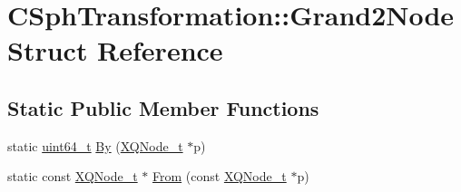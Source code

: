 \hypertarget{structCSphTransformation_1_1Grand2Node}{\section{C\-Sph\-Transformation\-:\-:Grand2\-Node Struct Reference}
\label{structCSphTransformation_1_1Grand2Node}
}
\subsection*{Static Public Member Functions}
\begin{DoxyCompactItemize}
\item 
static \hyperlink{sphinxstd_8h_aaa5d1cd013383c889537491c3cfd9aad}{uint64\-\_\-t} \hyperlink{structCSphTransformation_1_1Grand2Node_a3b54d7583d2c062c8709a0dbc57c2d38}{By} (\hyperlink{structXQNode__t}{X\-Q\-Node\-\_\-t} $\ast$p)
\item 
static const \hyperlink{structXQNode__t}{X\-Q\-Node\-\_\-t} $\ast$ \hyperlink{structCSphTransformation_1_1Grand2Node_a7cb75bca3049bd7f009d55e3038b549f}{From} (const \hyperlink{structXQNode__t}{X\-Q\-Node\-\_\-t} $\ast$p)
\end{DoxyCompactItemize}


